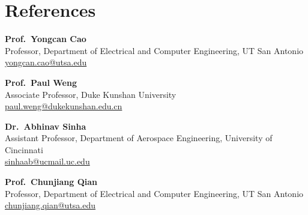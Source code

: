 \documentclass[letterpaper,11pt]{article}
\begin{document}
\section*{References}

\textbf{Prof.\ Yongcan Cao} \\
Professor, Department of Electrical and Computer Engineering, UT San Antonio \\
\href{mailto:yongcan.cao@utsa.edu}{yongcan.cao@utsa.edu}

\textbf{Prof.\ Paul Weng}  \\
Associate Professor, Duke Kunshan University \\
\href{mailto:paul.weng@dukekunshan.edu.cn}{paul.weng@dukekunshan.edu.cn}

\textbf{Dr.\ Abhinav Sinha} \\
Assistant Professor, Department of Aerospace Engineering, University of Cincinnati \\
\href{mailto:sinhaab@ucmail.uc.edu}{sinhaab@ucmail.uc.edu}

\textbf{Prof.\ Chunjiang Qian} \\
Professor, Department of Electrical and Computer Engineering, UT San Antonio \\
\href{mailto:chunjiang.qian@utsa.edu}{chunjiang.qian@utsa.edu}
\end{document}
